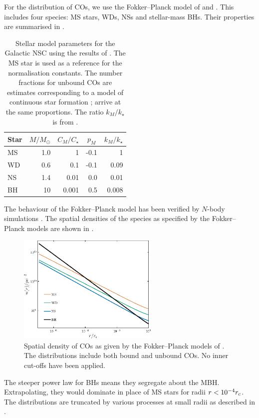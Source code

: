 For the distribution of COs, we use the Fokker--Planck model of \citet{Hopman2006, Hopman2006a} and \citet{Alexander2009}. This includes four species: MS stars, WDs, NSs and stellar-mass BHs. Their properties are summarised in .
\begin{table}\footnotesize
\centering
\begin{tabular}{l D{.}{.}{2.1} D{.}{.}{1.3} D{.}{.}{1.1} D{.}{.}{1.3}} 
\toprule
  Star &  &  &  &   \\ \midrule
  MS & 1.0 & 1 & -0.1 & 1 \\
  WD & 0.6 & 0.1 & -0.1 & 0.09 \\
  NS & 1.4 & 0.01 & 0.0 & 0.01  \\
  BH & 10 & 0.001 & 0.5 & 0.008 \\
\hline
\end{tabular}
\caption{Stellar model parameters for the Galactic NSC using the results of \citet{Alexander2009}. The MS star is used as a reference for the normalisation constants. The number fractions for unbound COs are estimates corresponding to a model of continuous star formation \citep{Alexander2005}; \citet{O'Leary2009} arrive at the same proportions.  The ratio $k_M/k_\star$ is from \citet{Toonen2009}.}\label{tab:HA}
\end{table}
The behaviour of the Fokker--Planck model has been verified by $N$-body simulations \citep{Baumgardt2004,Preto2010}. The spatial densities of the species as specified by the Fokker--Planck models are shown in . 
\begin{figure}%
  \centering
  \vspace{0.2\baselineskip}
  \includegraphics[width=0.6\textwidth]{./images/Fig_spatial_density}
    \caption{Spatial density of COs as given by the Fokker--Planck models of \citet{Alexander2009}. The distributions include both bound and unbound COs. No inner cut-offs have been applied.}   
    \label{fig:spatial-density} 
\end{figure}
The steeper power law for BHs means they segregate about the MBH. Extrapolating, they would dominate in place of MS stars for radii $r < 10^{-4}r_\mathrm{c}$. The distributions are truncated by various processes at small radii as described in .

